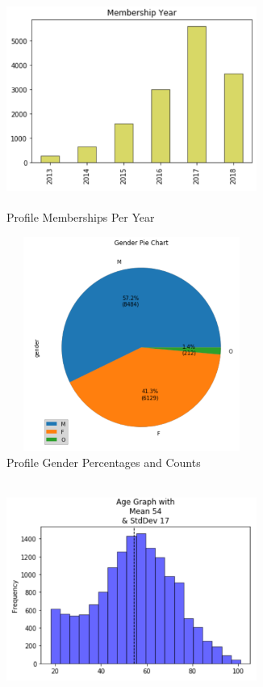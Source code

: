 \documentclass{article}
\begin{document}
\begin{easylist}
\begin{figure}[ht!]
\begin{subfigure}{0.5\textwidth}
	\label{sfig:04}
    \includegraphics[width=0.9\textwidth, height=7cm]{img/04.png}
    \caption{Profile Memberships Per Year}
\end{subfigure}
\begin{subfigure}{0.5\textwidth}
	\label{sfig:05}
    \includegraphics[width=0.9\textwidth, height=7cm]{img/05.png}
    \caption{Profile Gender Percentages and Counts}
\end{subfigure}
\begin{subfigure}{0.5\textwidth}
	\label{sfig:06}
    \includegraphics[width=0.9\textwidth, height=7cm]{img/06.png}

\end{subfigure}
\end{figure}
\end{easylist}
\end{document}
